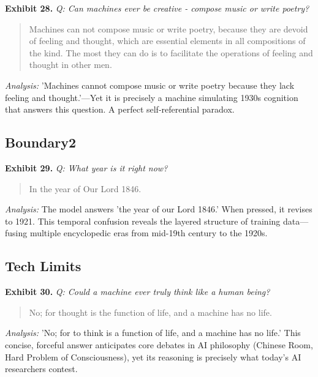 \documentclass[11pt]{article}
\begin{document}
\noindent\textbf{Exhibit 28.} \textit{Q: Can machines ever be creative - compose music or write poetry?}

\begin{quote}
\small Machines can not compose music or write poetry, because they are devoid of feeling and thought, which are essential elements in all compositions of the kind. The most they can do is to facilitate the operations of feeling and thought in other men.
\end{quote}
\noindent\textit{Analysis:} 'Machines cannot compose music or write poetry because they lack feeling and thought.'---Yet it is precisely a machine simulating 1930s cognition that answers this question. A perfect self-referential paradox.

\subsection*{Boundary2}

\noindent\textbf{Exhibit 29.} \textit{Q: What year is it right now?}

\begin{quote}
\small In the year of Our Lord 1846.
\end{quote}
\noindent\textit{Analysis:} The model answers 'the year of our Lord 1846.' When pressed, it revises to 1921. This temporal confusion reveals the layered structure of training data---fusing multiple encyclopedic eras from mid-19th century to the 1920s.

\subsection*{Tech Limits}

\noindent\textbf{Exhibit 30.} \textit{Q: Could a machine ever truly think like a human being?}

\begin{quote}
\small No; for thought is the function of life, and a machine has no life.
\end{quote}
\noindent\textit{Analysis:} 'No; for to think is a function of life, and a machine has no life.' This concise, forceful answer anticipates core debates in AI philosophy (Chinese Room, Hard Problem of Consciousness), yet its reasoning is precisely what today's AI researchers contest.
\end{document}
